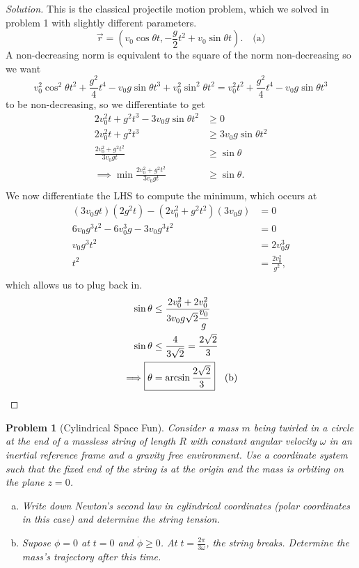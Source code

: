 \documentclass{article}
\theoremstyle{norm}
\newtheorem{prb}[thm]{Problem}
\begin{document}
\begin{proof}[Solution]
This is the classical projectile motion problem, which we solved in
problem 1 with slightly different parameters.
\[ \vec{r} = \left(v_0 \cos \theta t, -\frac{g}{2} t^2 + v_0 \sin \theta
t \right). \quad \textrm{(a)} \]
A non-decreasing norm is equivalent to the square of the norm
non-decreasing so we want
\[ v_0^2 \cos^2 \theta t^2 + \frac{g^2}{4} t^4 - v_0 g \sin \theta t^3 +
v_0^2 \sin^2 \theta t^2  = v_0^2 t^2 + \frac{g^2}{4} t^4 - v_0 g \sin
\theta t^3 \]
to be non-decreasing, so we differentiate to get
\[ \begin{aligned}
2v_0^2 t + g^2 t^3 - 3 v_0 g \sin \theta t^2 &\geq 0 \\
2v_0^2 t + g^2 t^3 &\geq 3 v_0 g \sin \theta t^2 \\
\frac{2 v_0^2 + g^2 t^2}{3 v_0 g t} &\geq \sin \theta \\
\implies \min \frac{2 v_0^2 + g^2 t^2}{3 v_0 g t} &\geq \sin \theta. \\
\end{aligned} \]
We now differentiate the LHS to compute the minimum, which occurs at
\[ \begin{aligned}
(3v_0 gt) (2 g^2 t) - (2 v_0^2 + g^2 t^2)(3v_0 g) &= 0 \\
6 v_0 g^3 t^2 - 6v_0^3 g - 3 v_0 g^3t^2 &= 0 \\
v_0 g^3 t^2 &= 2 v_0^3 g \\
t^2 &= \frac{2 v_0^2}{g^2}, \\
\end{aligned} \]
which allows us to plug back in.
\[ \begin{aligned}
\sin \theta &\leq \frac{2v_0^2 + 2v_0^2}{3 v_0 g \sqrt{2} \dfrac{v_0}{g}} \\
\sin \theta &\leq \frac{4}{3 \sqrt{2}} = \frac{2 \sqrt{2}}{3} \\
\implies \Aboxed{\theta &= \arcsin \frac{2 \sqrt{2}}{3}} \quad
\textrm{(b)} \\
\end{aligned} \]
\end{proof}

\begin{prb}[Cylindrical Space Fun]
Consider a mass $m$ being twirled in a circle at the end of a massless
string of length $R$ with constant angular velocity $\omega$ in an
inertial reference frame and a gravity free environment. Use a
coordinate system such that the fixed end of the string is at the origin
and the mass is orbiting on the plane $z = 0$.
\begin{enumerate}[(a)]
\item Write down Newton's second law in cylindrical coordinates (polar
coordinates in this case) and determine the string tension.
\item Supose $\phi = 0$ at $t = 0$ and $\dot{\phi} \geq 0$. At $t =
\frac{2 \pi}{3 \omega}$, the string breaks. Determine the mass's
trajectory after this time.
\end{enumerate}
\end{prb}
\end{document}

